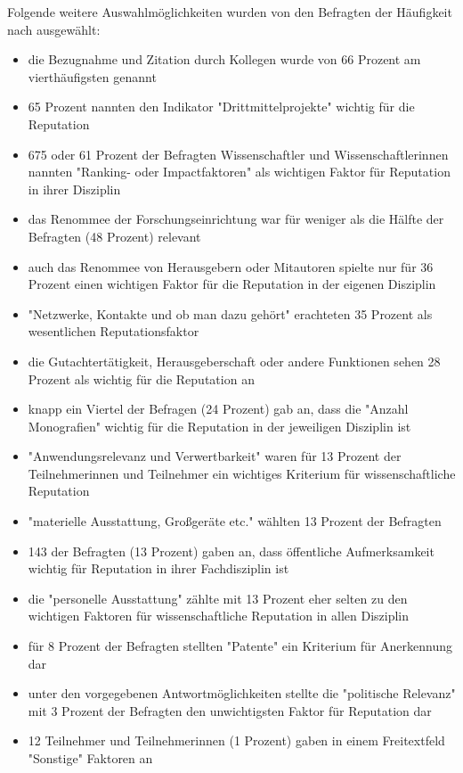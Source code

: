 Folgende weitere Auswahlmöglichkeiten wurden von den Befragten der Häufigkeit nach ausgewählt:
\begin{itemize}
\item die Bezugnahme und Zitation durch Kollegen wurde von 66 Prozent am vierthäufigsten genannt
\item 65 Prozent nannten den Indikator "Drittmittelprojekte" wichtig für die Reputation
\item 675 oder 61 Prozent der Befragten Wissenschaftler und Wissenschaftlerinnen nannten "Ranking- oder Impactfaktoren" als wichtigen Faktor für Reputation in ihrer Disziplin
\item das Renommee der Forschungseinrichtung war für weniger als die Hälfte der Befragten (48 Prozent) relevant
\item auch das Renommee von Herausgebern oder Mitautoren spielte nur für 36 Prozent einen wichtigen Faktor für die Reputation in der eigenen Disziplin
\item "Netzwerke, Kontakte und ob man dazu gehört" erachteten 35 Prozent als wesentlichen Reputationsfaktor
\item die Gutachtertätigkeit, Herausgeberschaft oder andere Funktionen sehen 28 Prozent als wichtig für die Reputation an
\item knapp ein Viertel der Befragen (24 Prozent) gab an, dass die "Anzahl Monografien" wichtig für die Reputation in der jeweiligen Disziplin ist
\item "Anwendungsrelevanz und Verwertbarkeit" waren für 13 Prozent der Teilnehmerinnen und Teilnehmer ein wichtiges Kriterium für wissenschaftliche Reputation
\item "materielle Ausstattung, Großgeräte etc." wählten 13 Prozent der Befragten
\item 143 der Befragten (13 Prozent) gaben an, dass öffentliche Aufmerksamkeit wichtig für Reputation in ihrer Fachdisziplin ist
\item die "personelle Ausstattung" zählte mit 13 Prozent eher selten zu den wichtigen Faktoren für wissenschaftliche Reputation in allen Disziplin
\item für 8 Prozent der Befragten stellten "Patente" ein Kriterium für Anerkennung dar
\item unter den vorgegebenen Antwortmöglichkeiten stellte die "politische Relevanz" mit 3 Prozent der Befragten den unwichtigsten Faktor für Reputation dar
\item 12 Teilnehmer und Teilnehmerinnen (1 Prozent) gaben in einem Freitextfeld "Sonstige" Faktoren an
\end{itemize}

